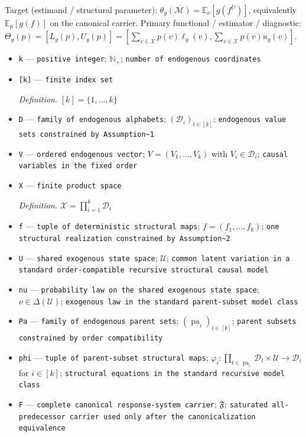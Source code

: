 \documentclass{article}
\begin{document}
Target (estimand / structural parameter): \(\theta_g(\mathcal M)=\mathbb E_{\nu}[g(f^U)]\), equivalently \(\mathbb E_{\mu}[g(f)]\) on the canonical carrier.
Primary functional / estimator / diagnostic: \(\Theta_g(p)=[L_g(p),U_g(p)]=[\sum_{v\in\mathcal X}p(v)\ell_g(v),\sum_{v\in\mathcal X}p(v)u_g(v)]\).
\begin{itemize}
  \item \texttt{k} --- \texttt{positive integer}; \(\mathbb N_{+}\); \texttt{number of endogenous coordinates}
  \item \texttt{[k]} --- \texttt{finite index set}
  \par\smallskip\noindent\emph{Definition.} \([k]=\{1,\ldots,k\}\)
  \item \texttt{D} --- \texttt{family of endogenous alphabets}; \((\mathcal D_i)_{i\in[k]}\); \texttt{endogenous value sets constrained by Assumption\textasciitilde{}1}
  \item \texttt{V} --- \texttt{ordered endogenous vector}; \(V=(V_1,\ldots,V_k)\) with \(V_i\in\mathcal D_i\); \texttt{causal variables in the fixed order}
  \item \texttt{X} --- \texttt{finite product space}
  \par\smallskip\noindent\emph{Definition.} \(\mathcal X=\prod_{i=1}^k\mathcal D_i\)
  \item \texttt{f} --- \texttt{tuple of deterministic structural maps}; \(f=(f_1,\ldots,f_k)\); \texttt{one structural realization constrained by Assumption\textasciitilde{}2}
  \item \texttt{U} --- \texttt{shared exogenous state space}; \(\mathcal U\); \texttt{common latent variation in a standard order-\allowbreak{}compatible recursive structural causal model}
  \item \texttt{nu} --- \texttt{probability law on the shared exogenous state space}; \(\nu\in\Delta(\mathcal U)\); \texttt{exogenous law in the standard parent-\allowbreak{}subset model class}
  \item \texttt{Pa} --- \texttt{family of endogenous parent sets}; \((\operatorname{pa}_i)_{i\in[k]}\); \texttt{parent subsets constrained by order compatibility}
  \item \texttt{phi} --- \texttt{tuple of parent-\allowbreak{}subset structural maps}; \(\varphi_i:\prod_{t\in\operatorname{pa}_i}\mathcal D_t\times\mathcal U\to\mathcal D_i\) for \(i\in[k]\); \texttt{structural equations in the standard recursive model class}
  \item \texttt{F} --- \texttt{complete canonical response-\allowbreak{}system carrier}; \(\mathfrak F\); \texttt{saturated all-\allowbreak{}predecessor carrier used only after the canonicalization equivalence}

\end{itemize}
\end{document}
